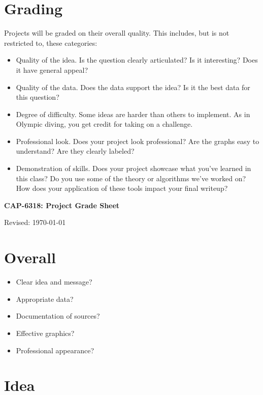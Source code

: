\documentclass[11pt]{article}
\begin{document}
\section*{Grading}

Projects will be graded on their overall quality.  This includes, but is not
restricted to, these categories:
%
\begin{itemize}
\item Quality of the idea.  Is the question clearly articulated?  Is it
interesting? Does it have general appeal?
\item Quality of the data.  Does the data support the idea? Is it the best data
for this question?
\item Degree of difficulty.  Some ideas are harder than others to implement. As
in Olympic diving, you get credit for taking on a challenge.
\item Professional look.  Does your project look professional?  Are the graphs
easy to understand?  Are they clearly labeled?
\item Demonstration of skills. Does your project showcase what you've learned in
this class? Do you use some of the theory or algorithms we've worked on? How
does your application of these tools impact your final writeup?
\end{itemize}





\pagebreak
\thispagestyle{empty}


\bigskip\bigskip
\centerline{\Large \bf CAP-6318:  Project Grade Sheet}
\centerline{Revised: \today}


\section*{Overall}

\begin{itemize} %
\item Clear idea and message?
\item Appropriate data?
\item Documentation of sources?
\item Effective graphics?
\item Professional appearance?
\end{itemize}
\bigskip

\section*{Idea}
\end{document}
